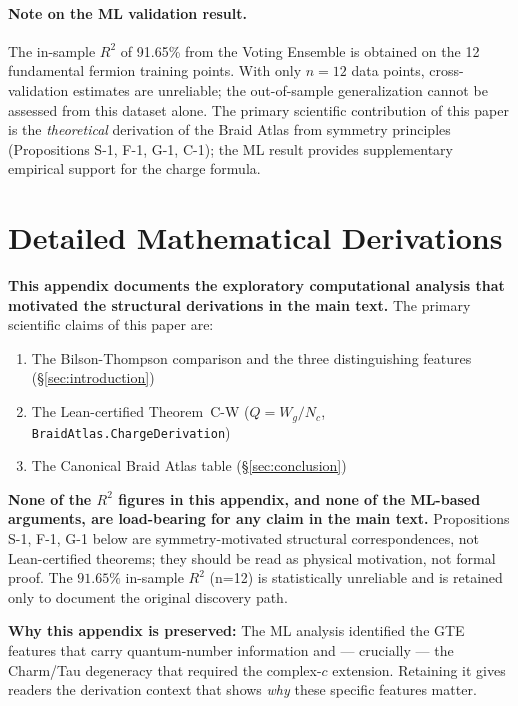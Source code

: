\documentclass[11pt]{article}
\theoremstyle{remark}
\begin{document}
\paragraph{Note on the ML validation result.} The in-sample $R^2$ of 91.65\% from the Voting Ensemble is obtained on the 12 fundamental fermion training points. With only $n=12$ data points, cross-validation estimates are unreliable; the out-of-sample generalization cannot be assessed from this dataset alone. The primary scientific contribution of this paper is the \emph{theoretical} derivation of the Braid Atlas from symmetry principles (Propositions S-1, F-1, G-1, C-1); the ML result provides supplementary empirical support for the charge formula.




\appendix
\section{Detailed Mathematical Derivations}
\label{app:proofs}

\begin{tcolorbox}[colback=yellow!10!white, colframe=orange!70!black,
                  title={Scope of this Appendix},
                  fonttitle=\bfseries, boxrule=0.8pt]
\textbf{This appendix documents the exploratory computational analysis that motivated the structural derivations in the main text.}
The primary scientific claims of this paper are:
\begin{enumerate}[nosep]
  \item The Bilson-Thompson comparison and the three distinguishing features (\S\ref{sec:introduction})
  \item The Lean-certified Theorem~C-W ($Q = W_g/N_c$, \texttt{BraidAtlas.ChargeDerivation})
  \item The Canonical Braid Atlas table (\S\ref{sec:conclusion})
\end{enumerate}
\textbf{None of the $R^2$ figures in this appendix, and none of the ML-based arguments, are load-bearing for any claim in the main text.} Propositions S-1, F-1, G-1 below are symmetry-motivated structural correspondences, not Lean-certified theorems; they should be read as physical motivation, not formal proof. The $91.65\%$ in-sample $R^2$ (n=12) is statistically unreliable and is retained only to document the original discovery path.

\textbf{Why this appendix is preserved:} The ML analysis identified the GTE features that carry quantum-number information and --- crucially --- the Charm/Tau degeneracy that required the complex-$c$ extension. Retaining it gives readers the derivation context that shows \emph{why} these specific features matter.
\end{tcolorbox}
\end{document}
